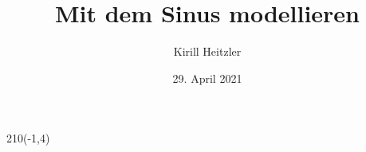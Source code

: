 \documentclass[12pt,a4paper]{article}
\title{Mit dem Sinus modellieren}
\author{Kirill Heitzler}
\date{29. April 2021}%
\begin{document}
\maketitle
\begin{textblock}{210}(-1,4)
	\begin{figure}[h!]
	\end{figure}
\end{textblock}
\newpage

\tableofcontents
\newpage




\newpage

\newpage

\end{document}
